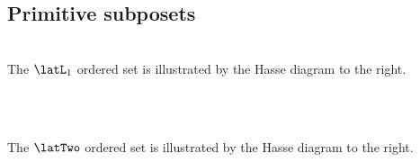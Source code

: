 \subsection{Primitive subposets}
\begin{minipage}{13\textwidth/16}
\begin{definition}
\label{def:lat_1}
\\The $\latL_1$ ordered set is illustrated by the Hasse diagram to the right.
\end{definition}
\end{minipage}%
\\\hfill{}

\begin{minipage}{\tw-10mm}
\begin{definition}
\label{def:lat_2}
\\The $\latTwo$ ordered set is illustrated by the Hasse diagram to the right.
\end{definition}
\end{minipage}%
\\\hfill{}

